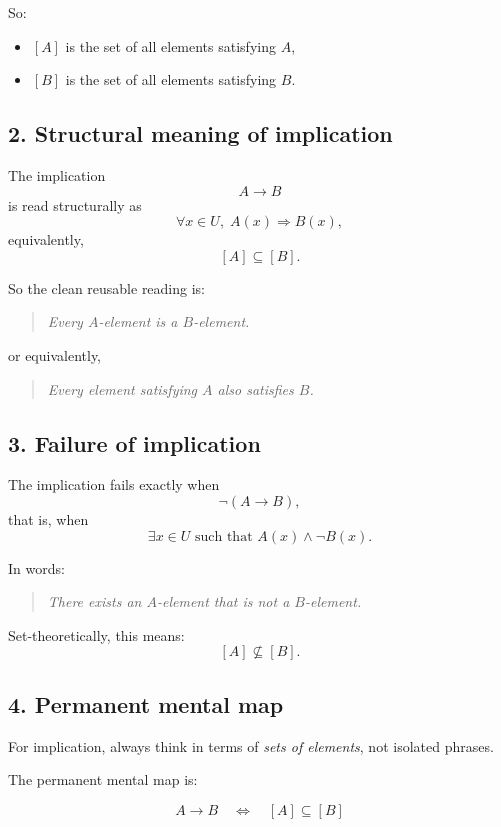 \documentclass{article}
\begin{document}
	So:
	\begin{itemize}
		\item \([A]\) is the set of all elements satisfying \(A\),
		\item \([B]\) is the set of all elements satisfying \(B\).
	\end{itemize}
	
	\subsection*{2. Structural meaning of implication}
	The implication
	\[
	A \to B
	\]
	is read structurally as
	\[
	\forall x \in U,\; A(x) \Rightarrow B(x),
	\]
	equivalently,
	\[
	[A] \subseteq [B].
	\]
	
	\noindent
	So the clean reusable reading is:
	
	\begin{quote}
		\emph{Every \(A\)-element is a \(B\)-element.}
	\end{quote}
	
	or equivalently,
	
	\begin{quote}
		\emph{Every element satisfying \(A\) also satisfies \(B\).}
	\end{quote}
	
	\subsection*{3. Failure of implication}
	The implication fails exactly when
	\[
	\neg(A \to B),
	\]
	that is, when
	\[
	\exists x \in U \text{ such that } A(x)\land \neg B(x).
	\]
	
	\noindent
	In words:
	
	\begin{quote}
		\emph{There exists an \(A\)-element that is not a \(B\)-element.}
	\end{quote}
	
	\noindent
	Set-theoretically, this means:
	\[
	[A] \nsubseteq [B].
	\]
	
	\subsection*{4. Permanent mental map}
	For implication, always think in terms of \emph{sets of elements}, not isolated phrases.
	
	The permanent mental map is:
	
	\[
	A \to B
	\quad \Longleftrightarrow \quad
	[A] \subseteq [B]
	\]
	
\end{document}
